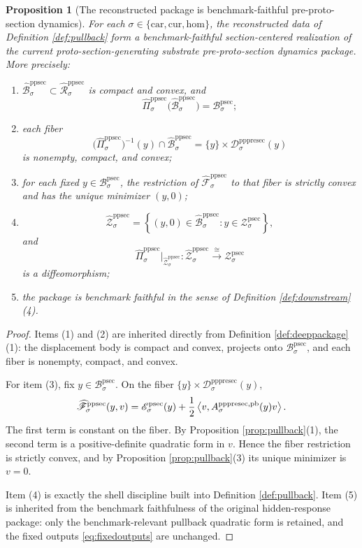 \documentclass[11pt]{article}
\newcommand{\Car}{\mathrm{car}}
\newcommand{\Cur}{\mathrm{cur}}
\newcommand{\Hom}{\mathrm{hom}}
\newcommand{\ProtoSectionBody}[1]{\mathcal B_{#1}^{\mathrm{psec}}}
\newcommand{\ProtoSectionFunctional}[1]{\mathscr E_{#1}^{\mathrm{psec}}}
\newcommand{\ProtoSectionShell}[1]{\mathcal Z_{#1}^{\mathrm{psec}}}
\newcommand{\PrePreProtoSectionResidualBody}[1]{\mathcal D_{#1}^{\mathrm{pppresec}}}
\newcommand{\PrePreProtoSectionPullbackOperator}[1]{A_{#1}^{\mathrm{pppresec,pb}}}
\newcommand{\PullbackPreProtoSectionState}[1]{\widehat{\mathcal R}_{#1}^{\mathrm{ppsec}}}
\newcommand{\PullbackPreProtoSectionBody}[1]{\widehat{\mathcal B}_{#1}^{\mathrm{ppsec}}}
\newcommand{\PullbackPreProtoSectionProj}[1]{\widehat{\Pi}_{#1}^{\mathrm{ppsec}}}
\newcommand{\PullbackPreProtoSectionFunctional}[1]{\widehat{\mathscr F}_{#1}^{\mathrm{ppsec}}}
\newcommand{\PullbackPreProtoSectionShell}[1]{\widehat{\mathcal Z}_{#1}^{\mathrm{ppsec}}}
\newtheorem{proposition}{Proposition}
\begin{document}
\begin{proposition}[The reconstructed package is benchmark-faithful pre-proto-section dynamics]
\label{prop:package}
For each \(\sigma\in\{\Car,\Cur,\Hom\}\), the reconstructed data of Definition \ref{def:pullback} form a benchmark-faithful section-centered realization of the current proto-section-generating substrate pre-proto-section dynamics package. More precisely:
\begin{enumerate}
    \item \(\PullbackPreProtoSectionBody{\sigma}\subset\PullbackPreProtoSectionState{\sigma}\) is compact and convex, and
    \[
    \PullbackPreProtoSectionProj{\sigma}\bigl(\PullbackPreProtoSectionBody{\sigma}\bigr)
    =
    \ProtoSectionBody{\sigma};
    \]
    \item each fiber
    \[
    \bigl(\PullbackPreProtoSectionProj{\sigma}\bigr)^{-1}(y)
    \cap
    \PullbackPreProtoSectionBody{\sigma}
    =
    \{y\}\times\PrePreProtoSectionResidualBody{\sigma}(y)
    \]
    is nonempty, compact, and convex;
    \item for each fixed \(y\in\ProtoSectionBody{\sigma}\), the restriction of
    \(\PullbackPreProtoSectionFunctional{\sigma}\) to that fiber is strictly convex and has the unique minimizer \((y,0)\);
    \item
    \[
    \PullbackPreProtoSectionShell{\sigma}
    =
    \left\{
    (y,0)\in\PullbackPreProtoSectionBody{\sigma}:y\in\ProtoSectionShell{\sigma}
    \right\},
    \]
    and
    \[
    \PullbackPreProtoSectionProj{\sigma}\big|_{\PullbackPreProtoSectionShell{\sigma}}
    :
    \PullbackPreProtoSectionShell{\sigma}
    \xrightarrow{\cong}
    \ProtoSectionShell{\sigma}
    \]
    is a diffeomorphism;
    \item the package is benchmark faithful in the sense of Definition \ref{def:downstream}(4).
\end{enumerate}
\end{proposition}

\begin{proof}
Items (1) and (2) are inherited directly from Definition \ref{def:deeppackage}(1): the displacement body is compact and convex, projects onto \(\ProtoSectionBody{\sigma}\), and each fiber is nonempty, compact, and convex.

For item (3), fix \(y\in\ProtoSectionBody{\sigma}\). On the fiber \(\{y\}\times\PrePreProtoSectionResidualBody{\sigma}(y)\),
\[
\PullbackPreProtoSectionFunctional{\sigma}(y,v)
=
\ProtoSectionFunctional{\sigma}(y)
+
\frac{1}{2}
\ev{v,\PrePreProtoSectionPullbackOperator{\sigma}(y)v}.
\]
The first term is constant on the fiber. By Proposition \ref{prop:pullback}(1), the second term is a positive-definite quadratic form in \(v\). Hence the fiber restriction is strictly convex, and by Proposition \ref{prop:pullback}(3) its unique minimizer is \(v=0\).

Item (4) is exactly the shell discipline built into Definition \ref{def:pullback}. Item (5) is inherited from the benchmark faithfulness of the original hidden-response package: only the benchmark-relevant pullback quadratic form is retained, and the fixed outputs \eqref{eq:fixedoutputs} are unchanged.
\end{proof}
\end{document}
